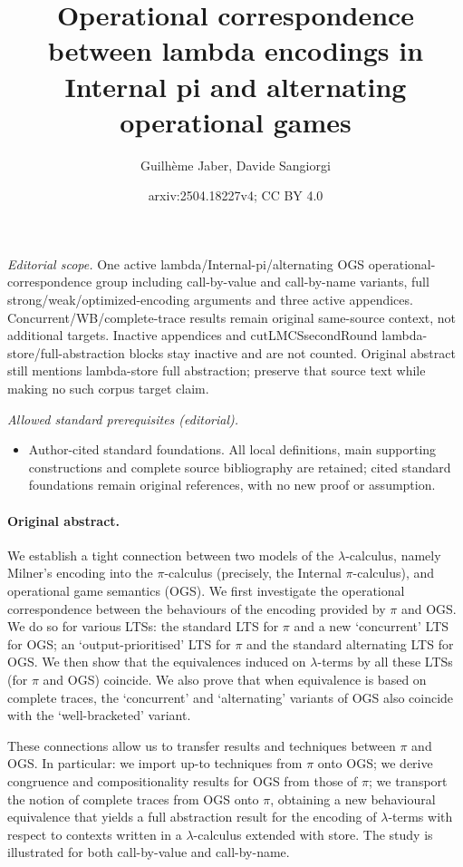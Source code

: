 \documentclass[11pt,a4paper]{amsart}
\title{Operational correspondence between lambda encodings in Internal pi and alternating operational games}
\author{Guilhème Jaber, Davide Sangiorgi}
\date{arxiv:2504.18227v4; CC BY 4.0}
\theoremstyle{plain}
\theoremstyle{definition}
\theoremstyle{defC}
\theoremstyle{thmC}
\theoremstyle{plain}
\numberwithin{equation}{section}
\theoremstyle{plain}
\theoremstyle{definition}
\begin{document}
\maketitle
\noindent\textit{Editorial scope.} One active lambda/Internal-pi/alternating OGS operational-correspondence group including call-by-value and call-by-name variants, full strong/weak/optimized-encoding arguments and three active appendices. Concurrent/WB/complete-trace results remain original same-source context, not additional targets. Inactive appendices and cutLMCSsecondRound lambda-store/full-abstraction blocks stay inactive and are not counted. Original abstract still mentions lambda-store full abstraction; preserve that source text while making no such corpus target claim.\par\medskip
\noindent\textit{Allowed standard prerequisites (editorial).}\begin{itemize}
\item Author-cited standard foundations. All local definitions, main supporting constructions and complete source bibliography are retained; cited standard foundations remain original references, with no new proof or assumption.
\end{itemize}\medskip
\paragraph{Original abstract.} 
 We establish a tight connection between two models of the $\lambda$-calculus, 
 namely Milner's encoding into the $\pi$-calculus (precisely, the Internal $\pi$-calculus), 
 and operational game semantics (OGS).
 We first investigate the operational correspondence between 
 the behaviours of the encoding provided by
 $\pi$ and OGS. 
 We do so for various LTSs:  the standard LTS for  
 $\pi$ and a new 
 `concurrent' LTS for OGS;  an `output-prioritised' LTS for  $\pi$ 
 and the standard alternating LTS for OGS.  We then show that the equivalences induced on
 $\lambda$-terms by all these LTSs (for $\pi$ and OGS) coincide. 
 We also prove that when equivalence is based on complete traces,  
 the `concurrent' and `alternating' variants of   OGS 
 also coincide with the `well-bracketed' variant. 

 These connections allow us to transfer results and techniques between $\pi$ and OGS. In
 particular: 
 we import up-to techniques from $\pi$ onto OGS; we derive
 congruence and compositionality results for OGS from those of $\pi$; 
 we transport the notion of complete traces from OGS onto $\pi$, obtaining a new  
 behavioural equivalence that yields a full abstraction result for the encoding of
 $\lambda$-terms with respect to contexts written in a $\lambda$-calculus extended with store. 
%
 The study is illustrated for both call-by-value and call-by-name.
\end{document}

